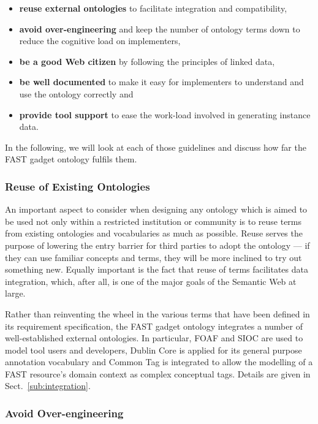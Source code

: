\documentclass[twoside]{fast_latex}
\begin{document}
\singlespacing
\begin{itemize}
	\item \textbf{reuse external ontologies} to facilitate integration and compatibility,
	\item \textbf{avoid over-engineering} and keep the number of ontology terms down to reduce the cognitive load on implementers,
	\item \textbf{be a good Web citizen} by following the principles of linked data,
	\item \textbf{be well documented} to make it easy for implementers to understand and use the ontology correctly and
	\item \textbf{provide tool support} to ease the work-load involved in generating instance data.
\end{itemize}
\doublespacing

In the following, we will look at each of those guidelines and discuss how far the FAST gadget ontology fulfils them.

\subsubsection{Reuse of Existing Ontologies} %
\label{ssub:reuse_of_existing_ontologies}

An important aspect to consider when designing any ontology which is aimed to be used not only within a restricted institution or community is to reuse terms from existing ontologies and vocabularies as much as possible. Reuse serves the purpose of lowering the entry barrier for third parties to adopt the ontology --- if they can use familiar concepts and terms, they will be more inclined to try out something new. Equally important is the fact that reuse of terms facilitates data integration, which, after all, is one of the major goals of the Semantic Web at large.

Rather than reinventing the wheel in the various terms that have been defined in its requirement specification, the FAST gadget ontology integrates a number of well-established external ontologies. In particular, FOAF and SIOC are used to model tool users and developers, Dublin Core is applied for its general purpose annotation vocabulary and Common Tag is integrated to allow the modelling of a FAST resource's domain context as complex conceptual tags. Details are given in Sect.~\ref{sub:integration}.

\subsubsection{Avoid Over-engineering} %
\label{ssub:avoid_of_over_engineering}
\end{document}
